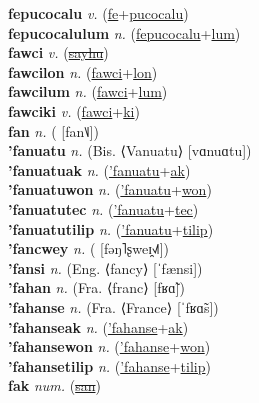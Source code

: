 \textbf{fepucocalu} \textit{v.} (\hyperref[fe]{fe}+\hyperref[pucocalu]{pucocalu})
 \label{fepucocalu} \\
\textbf{fepucocalulum} \textit{n.} (\hyperref[fepucocalu]{fepucocalu}+\hyperref[lum]{lum})
 \label{fepucocalulum} \\
\textbf{fawci} \textit{v.} (\hyperref[sayhu]{\sout{sayhu}})
 \label{fawci} \\
\textbf{fawcilon} \textit{n.} (\hyperref[fawci]{fawci}+\hyperref[lon]{lon})
 \label{fawcilon} \\
\textbf{fawcilum} \textit{n.} (\hyperref[fawci]{fawci}+\hyperref[lum]{lum})
 \label{fawcilum} \\
\textbf{fawciki} \textit{v.} (\hyperref[fawci]{fawci}+\hyperref[ki]{ki})
 \label{fawciki} \\
\textbf{fan} \textit{n.} ( [fan˥˩])
 \label{fan} \\
\textbf{'fanuatu} \textit{n.} (Bis. ⟨Vanuatu⟩ [vɑnuɑtu])
 \label{'fanuatu} \\
\textbf{'fanuatuak} \textit{n.} (\hyperref['fanuatu]{'fanuatu}+\hyperref[ak]{ak})
 \label{'fanuatuak} \\
\textbf{'fanuatuwon} \textit{n.} (\hyperref['fanuatu]{'fanuatu}+\hyperref[won]{won})
 \label{'fanuatuwon} \\
\textbf{'fanuatutec} \textit{n.} (\hyperref['fanuatu]{'fanuatu}+\hyperref[tec]{tec})
 \label{'fanuatutec} \\
\textbf{'fanuatutilip} \textit{n.} (\hyperref['fanuatu]{'fanuatu}+\hyperref[tilip]{tilip})
 \label{'fanuatutilip} \\
\textbf{'fancwey} \textit{n.} ( [fəŋ˥ʂweɪ̯˧˩˥])
 \label{'fancwey} \\
\textbf{'fansi} \textit{n.} (Eng. ⟨fancy⟩ [ˈfænsi])
 \label{'fansi} \\
\textbf{'fahan} \textit{n.} (Fra. ⟨franc⟩ [fʁɑ̃])
 \label{'fahan} \\
\textbf{'fahanse} \textit{n.} (Fra. ⟨France⟩ [ˈfʁɑ̃s])
 \label{'fahanse} \\
\textbf{'fahanseak} \textit{n.} (\hyperref['fahanse]{'fahanse}+\hyperref[ak]{ak})
 \label{'fahanseak} \\
\textbf{'fahansewon} \textit{n.} (\hyperref['fahanse]{'fahanse}+\hyperref[won]{won})
 \label{'fahansewon} \\
\textbf{'fahansetilip} \textit{n.} (\hyperref['fahanse]{'fahanse}+\hyperref[tilip]{tilip})
 \label{'fahansetilip} \\
\textbf{fak} \textit{num.} (\hyperref[san]{\sout{san}})
